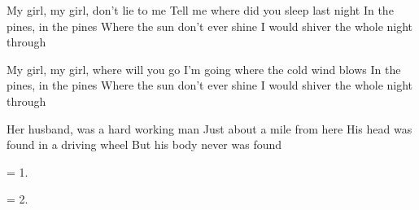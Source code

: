 
\sloka
My girl, my girl, don’t lie to me
Tell me where did you sleep last night
In the pines, in the pines
Where the sun don’t ever shine
I would shiver the whole night through

\sloka
My girl, my girl, where will you go
I’m going where the cold wind blows
In the pines, in the pines
Where the sun don’t ever shine
I would shiver the whole night through

\sloka
Her husband, was a hard working man
Just about a mile from here
His head was found in a driving wheel
But his body never was found

\sloka
= 1.

\sloka
= 2.
